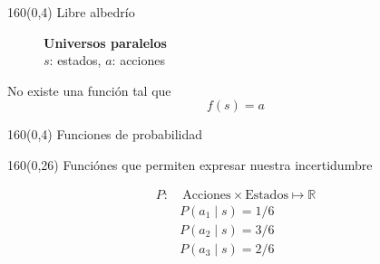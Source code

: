 \documentclass[shownotes,aspectratio=169]{beamer}
\begin{document}
\begin{frame}[plain]
 \begin{textblock}{160}(0,4)
 \centering \LARGE
Libre albedrío
\end{textblock}
\vspace{0.75cm}


 \begin{figure}[H]
\centering
    \caption*{\normalsize \textbf{Universos paralelos} \ \ \ \   \\ $s$: estados, $a$: acciones \ \ \ \  }
\end{figure}

\pause
\vspace{0.3cm}

\centering \Large No existe una funci\'on tal que 
 \begin{equation*}
  f(s)=a
 \end{equation*}

\end{frame}


\begin{frame}[plain]
 \begin{textblock}{160}(0,4)
 \centering \LARGE
Funciones de probabilidad
\end{textblock}
\vspace{1.25cm}

\begin{textblock}{160}(0,26)
\centering  \Large 
Funci\'ones que permiten expresar nuestra incertidumbre 
\end{textblock}

 
 \begin{align*}
 P : & \ \text{Acciones}\times\text{Estados} \mapsto \mathbb{R} \\
    &P(a_1 \mid s)  = 1/6 \\
   &P(a_2 \mid s)  = 3/6 \\
   &P(a_3 \mid s)  = 2/6 
 \end{align*}
 
 \vspace{0.3cm}

\end{frame}
\end{document}
